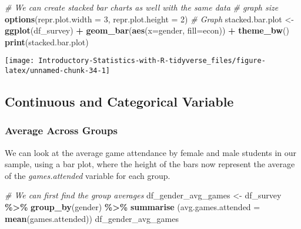 \documentclass[
]{book}
\newenvironment{Shaded}{\begin{snugshade}}{\end{snugshade}}
\newcommand{\CommentTok}[1]{\textcolor[rgb]{0.56,0.35,0.01}{\textit{#1}}}
\newcommand{\DataTypeTok}[1]{\textcolor[rgb]{0.13,0.29,0.53}{#1}}
\newcommand{\DecValTok}[1]{\textcolor[rgb]{0.00,0.00,0.81}{#1}}
\newcommand{\KeywordTok}[1]{\textcolor[rgb]{0.13,0.29,0.53}{\textbf{#1}}}
\newcommand{\NormalTok}[1]{#1}
\newcommand{\OperatorTok}[1]{\textcolor[rgb]{0.81,0.36,0.00}{\textbf{#1}}}
\newcommand{\StringTok}[1]{\textcolor[rgb]{0.31,0.60,0.02}{#1}}
\begin{document}
\begin{Shaded}
\begin{Highlighting}[]
\CommentTok{\# We can create stacked bar charts as well with the same data}
\CommentTok{\# graph size}
\KeywordTok{options}\NormalTok{(}\DataTypeTok{repr.plot.width =} \DecValTok{3}\NormalTok{, }\DataTypeTok{repr.plot.height =} \DecValTok{2}\NormalTok{)}
\CommentTok{\# Graph}
\NormalTok{stacked.bar.plot \textless{}{-}}\StringTok{ }\KeywordTok{ggplot}\NormalTok{(df\_survey) }\OperatorTok{+}
\StringTok{    }\KeywordTok{geom\_bar}\NormalTok{(}\KeywordTok{aes}\NormalTok{(}\DataTypeTok{x=}\NormalTok{gender, }\DataTypeTok{fill=}\NormalTok{econ)) }\OperatorTok{+}
\StringTok{    }\KeywordTok{theme\_bw}\NormalTok{()}
\KeywordTok{print}\NormalTok{(stacked.bar.plot)}
\end{Highlighting}
\end{Shaded}

\begin{center}\texttt{[image: Introductory-Statistics-with-R-tidyverse\_files/figure-latex/unnamed-chunk-34-1]} \end{center}

\hypertarget{continuous-and-categorical-variable}{%
\subsection{Continuous and Categorical Variable}\label{continuous-and-categorical-variable}}

\hypertarget{average-across-groups}{%
\subsubsection{Average Across Groups}\label{average-across-groups}}

We can look at the average game attendance by female and male students in our sample, using a bar plot, where the height of the bars now represent the average of the \emph{games.attended} variable for each group.

\begin{Shaded}
\begin{Highlighting}[]
\CommentTok{\# We can first find the group averages}
\NormalTok{df\_gender\_avg\_games \textless{}{-}}\StringTok{ }\NormalTok{df\_survey }\OperatorTok{\%\textgreater{}\%}
\StringTok{                        }\KeywordTok{group\_by}\NormalTok{(gender) }\OperatorTok{\%\textgreater{}\%}
\StringTok{                        }\KeywordTok{summarise}\NormalTok{ (}\DataTypeTok{avg.games.attended =} \KeywordTok{mean}\NormalTok{(games.attended))}
\NormalTok{df\_gender\_avg\_games}
\end{Highlighting}
\end{Shaded}
\end{document}
